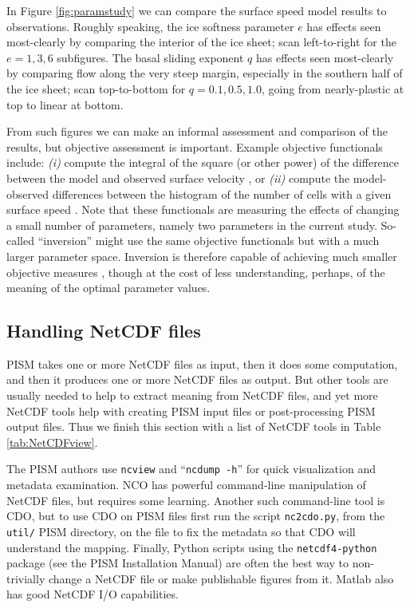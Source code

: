 In Figure \ref{fig:paramstudy} we can compare the surface speed model results to observations.  Roughly speaking, the ice softness parameter $e$ has effects seen most-clearly by comparing the interior of the ice sheet; scan left-to-right for the $e=1,3,6$ subfigures.  The basal sliding exponent $q$ has effects seen most-clearly by comparing flow along the very steep margin, especially in the southern half of the ice sheet; scan top-to-bottom for $q=0.1,0.5,1.0$, going from nearly-plastic at top to linear at bottom.

From such figures we can make an informal assessment and comparison of the results, but objective assessment is important.  Example objective functionals include: \emph{(i)} compute the integral of the square (or other power) of the difference between the model and observed surface velocity \cite{AschwandenAdalgeirsdottirKhroulev}, or \emph{(ii)} compute the model-observed differences between the histogram of the number of cells with a given surface speed \cite{BKAJS}.  Note that these functionals are measuring the effects of changing a small number of parameters, namely two parameters in the current study.  So-called ``inversion'' might use the same objective functionals but with a much larger parameter space.  Inversion is therefore capable of achieving much smaller objective measures \cite{Habermannetal2013,Larouretal2012,Priceetal2011}, though at the cost of less understanding, perhaps, of the meaning of the optimal parameter values.

\clearpage  %

\subsection{Handling NetCDF files}\label{subsect:nctoolsintro}  PISM takes one or more NetCDF files as input, then it does some computation, and then it produces one or more NetCDF files as output.  But other tools are usually needed to help to extract meaning from NetCDF files, and yet more NetCDF tools help with creating PISM input files or post-processing PISM output files.  Thus we finish this section with a list of NetCDF tools in Table \ref{tab:NetCDFview}.

The PISM authors use \texttt{ncview} and ``\texttt{ncdump -h}'' for quick visualization and metadata examination.  NCO has powerful command-line manipulation of NetCDF files, but requires some learning.  Another such command-line tool is CDO, but to use CDO on PISM files first run the script \texttt{nc2cdo.py}, from the \texttt{util/} PISM directory, on the file to fix the metadata so that CDO will understand the mapping.  Finally, Python scripts using the \texttt{netcdf4-python} package (see the PISM Installation Manual) are often the best way to non-trivially change a NetCDF file or make publishable figures from it.  Matlab also has good NetCDF I/O capabilities.

